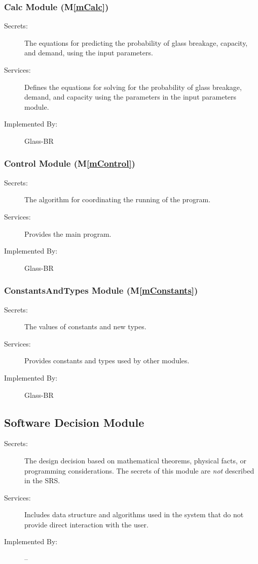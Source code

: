 \documentclass[12pt]{article}
\newcommand{\mref}[1]{M\ref{#1}}
\begin{document}
\subsubsection{Calc Module (\mref{mCalc})}

\begin{description}
\item[Secrets:] The equations for predicting the probability of glass 
breakage, capacity, and demand, using the input parameters.
\item[Services:] Defines the equations for solving for the probability of glass 
breakage, demand, and capacity using the parameters in the input parameters 
module.
\item[Implemented By:] Glass-BR
\end{description} 
 
\subsubsection{Control Module (\mref{mControl})}

\begin{description}
\item[Secrets:] The algorithm for coordinating the running of the program.
\item[Services:] Provides the main program.
\item[Implemented By:] Glass-BR
\end{description}

\subsubsection{ConstantsAndTypes Module (\mref{mConstants})}

\begin{description}
\item[Secrets:] The values of constants and new types.
\item[Services:] Provides constants and types used by other modules.
\item[Implemented By:] Glass-BR
\end{description}

\subsection{Software Decision Module}

\begin{description}
\item[Secrets:] The design decision based on mathematical theorems, physical
  facts, or programming considerations. The secrets of this module are
  \emph{not} described in the SRS.
\item[Services:] Includes data structure and algorithms used in the system that
  do not provide direct interaction with the user. 
\item[Implemented By:] --
\end{description}
\end{document}
